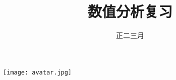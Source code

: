 \documentclass[cn,hazy,cyan,14pt,screen]{elegantnote}
\title{数值分析复习}
\author{正二三月}
\date{}
\begin{document}
\maketitle

\centerline{
  \texttt{[image: avatar.jpg]}
}

\clearpage



\clearpage



\clearpage



\clearpage



\clearpage



\end{document}
